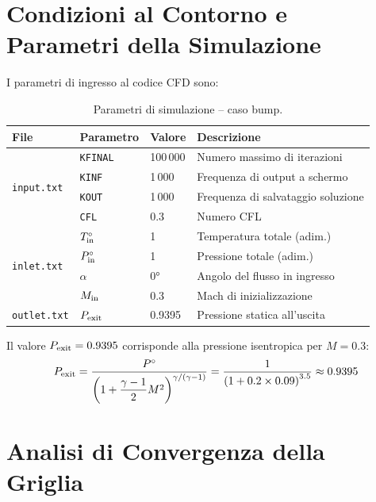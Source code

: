\section{Condizioni al Contorno e Parametri della Simulazione}
\label{sec:bump_bc}

I parametri di ingresso al codice CFD sono:

\begin{table}[H]
  \centering
  \caption{Parametri di simulazione -- caso bump.}
  \label{tab:bump_param}
  \begin{tabular}{llll}
    \toprule
    File & Parametro & Valore & Descrizione \\
    \midrule
    \multirow{4}{*}{\texttt{input.txt}}
      & \texttt{KFINAL} & 100\,000 & Numero massimo di iterazioni \\
      & \texttt{KINF}   & 1\,000   & Frequenza di output a schermo \\
      & \texttt{KOUT}   & 1\,000   & Frequenza di salvataggio soluzione \\
      & \texttt{CFL}    & 0.3      & Numero CFL \\
    \midrule
    \multirow{4}{*}{\texttt{inlet.txt}}
      & $T^\circ_{\rm in}$ & 1    & Temperatura totale (adim.) \\
      & $P^\circ_{\rm in}$ & 1    & Pressione totale (adim.) \\
      & $\alpha$           & 0°   & Angolo del flusso in ingresso \\
      & $M_{\rm in}$       & 0.3  & Mach di inizializzazione \\
    \midrule
    \texttt{outlet.txt}
      & $P_{\rm exit}$ & 0.9395 & Pressione statica all'uscita\\
    \bottomrule
  \end{tabular}
\end{table}

Il valore $P_{\rm exit} = 0.9395$ corrisponde alla pressione isentropica per $M = 0.3$:
\begin{equation}
  P_{\rm exit} = \frac{P^\circ}{\left(1 + \dfrac{\gamma-1}{2}M^2\right)^{\gamma/(\gamma-1)}}
  = \frac{1}{\left(1 + 0.2 \times 0.09\right)^{3.5}} \approx 0.9395
\end{equation}

\section{Analisi di Convergenza della Griglia}
\label{sec:bump_convergenza}

